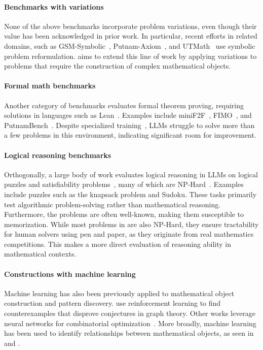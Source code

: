 \paragraph{Benchmarks with variations} None of the above benchmarks incorporate problem variations, even though their value has been acknowledged in prior work. In particular, recent efforts in related domains, such as GSM-Symbolic~\citep{gsmsymbolic}, Putnam-Axiom~\citep{gulati2024putnamaxiom}, and UTMath~\citep{utmath} use symbolic problem reformulation. \mc aims to extend this line of work by applying variations to problems that require the construction of complex mathematical objects.

\paragraph{Formal math benchmarks}
Another category of benchmarks evaluates formal theorem proving, requiring solutions in languages such as Lean~\citep{lean}. Examples include miniF2F~\citep{minif2f}, FIMO~\citep{fimo}, and PutnamBench~\citep{putnambench}. Despite specialized training~\citep{xin2024deepseekprover}, LLMs struggle to solve more than a few problems in this environment, indicating significant room for improvement.

\paragraph{Logical reasoning benchmarks} Orthogonally, a large body of work evaluates logical reasoning in LLMs on logical puzzles and satisfiability problems~\citep{gui2024logicgame, puzzlebench, korbench}, many of which are NP-Hard~\citep{nphardeval}. Examples include puzzles such as the knapsack problem and Sudoku. These tasks primarily test algorithmic problem-solving rather than mathematical reasoning. Furthermore, the problems are often well-known, making them susceptible to memorization. While most problems in \mc are also NP-Hard, they ensure tractability for human solvers using pen and paper, as they originate from real mathematics competitions. This makes \mc a more direct evaluation of reasoning ability in mathematical contexts.


\paragraph{Constructions with machine learning}
Machine learning has also been previously applied to mathematical object construction and pattern discovery. \citet{wagner2021constructions} use reinforcement learning to find counterexamples that disprove conjectures in graph theory. Other works leverage neural networks for combinatorial optimization~\citep{bello2017neural, gasse2019exact}. More broadly, machine learning has been used to identify relationships between mathematical objects, as seen in \citet{davies2021advancing} and \citet{davila2024txgraffiti}.
